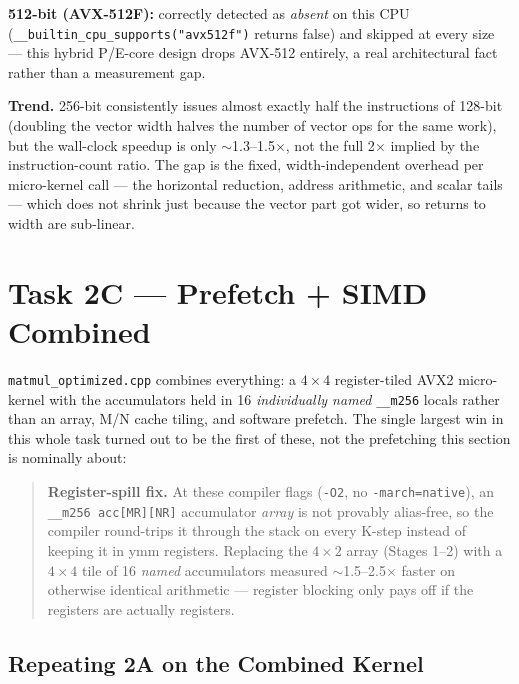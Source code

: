 \documentclass[11pt]{article}
\begin{document}
\textbf{512-bit (AVX-512F):} correctly detected as \emph{absent} on this CPU
(\texttt{\_\_builtin\_cpu\_supports("avx512f")} returns false) and skipped at every size
--- this hybrid P/E-core design drops AVX-512 entirely, a real architectural fact rather
than a measurement gap.

\textbf{Trend.} 256-bit consistently issues almost exactly half the instructions of
128-bit (doubling the vector width halves the number of vector ops for the same work),
but the wall-clock speedup is only $\sim$1.3--1.5$\times$, not the full 2$\times$ implied
by the instruction-count ratio. The gap is the fixed, width-independent overhead per
micro-kernel call --- the horizontal reduction, address arithmetic, and scalar tails ---
which does not shrink just because the vector part got wider, so returns to width are
sub-linear.

\section{Task 2C --- Prefetch + SIMD Combined}
\label{sec:2c}

\texttt{matmul\_optimized.cpp} combines everything: a $4\times4$ register-tiled AVX2
micro-kernel with the accumulators held in 16 \emph{individually named} \texttt{\_\_m256}
locals rather than an array, M/N cache tiling, and software prefetch. The single largest
win in this whole task turned out to be the first of these, not the prefetching this
section is nominally about:

\begin{quote}
\textbf{Register-spill fix.} At these compiler flags (\texttt{-O2}, no
\texttt{-march=native}), an \texttt{\_\_m256 acc[MR][NR]} accumulator \emph{array} is not
provably alias-free, so the compiler round-trips it through the stack on every K-step
instead of keeping it in ymm registers. Replacing the $4\times2$ array (Stages 1--2) with
a $4\times4$ tile of 16 \emph{named} accumulators measured $\sim$1.5--2.5$\times$ faster
on otherwise identical arithmetic --- register blocking only pays off if the registers
are actually registers.
\end{quote}

\subsection{Repeating 2A on the Combined Kernel}
\end{document}
